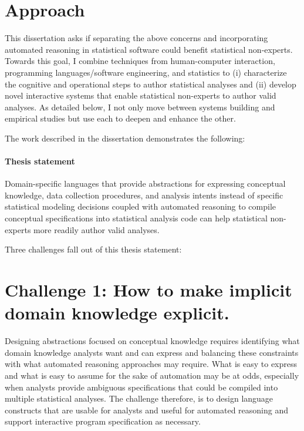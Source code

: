 \section*{Approach}
This dissertation asks if separating the above concerns and incorporating
automated reasoning in statistical software could benefit statistical
non-experts. Towards this goal, I combine techniques from human-computer
interaction, programming languages/software engineering, and statistics to (i)
characterize the cognitive and operational steps to author statistical analyses
and (ii) develop novel interactive systems that enable statistical non-experts
to author valid analyses. As detailed below, I not only move between systems
building and empirical studies but use each to deepen and enhance the other.

The work described in the dissertation demonstrates the following:%
\paragraph{Thesis statement}

Domain-specific languages that provide abstractions for expressing conceptual
knowledge, data collection procedures, and analysis intents instead of specific
statistical modeling decisions coupled with automated reasoning to compile
conceptual specifications into statistical analysis code can help statistical
non-experts more readily author valid analyses. 

Three challenges fall out of this thesis statement: 

\section*{Challenge 1: How to make implicit domain knowledge explicit.} %
Designing abstractions focused on conceptual knowledge requires identifying what
domain knowledge analysts want and can express and balancing these constraints
with what automated reasoning approaches may require. What is easy to express
and what is easy to assume for the sake of automation may be at odds, especially
when analysts provide ambiguous specifications that could be compiled into
multiple statistical analyses. The challenge therefore, is to design language
constructs that are usable for analysts and useful for automated reasoning and
support interactive program specification as necessary.

